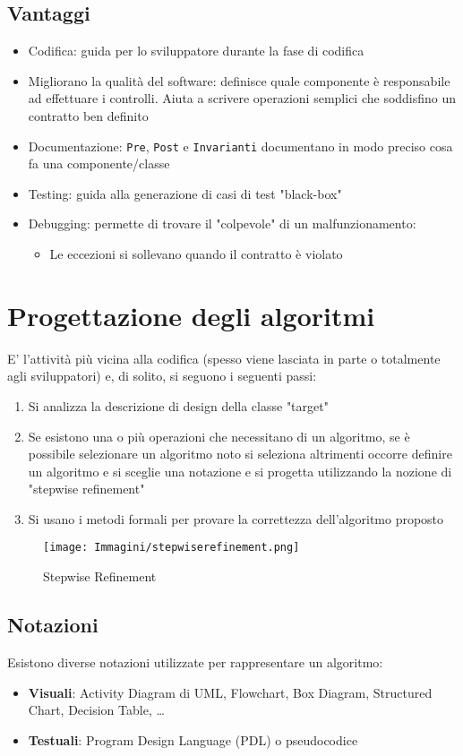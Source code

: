 \documentclass[12pt, a4paper]{report}
\begin{document}
\subsection{Vantaggi}
\begin{itemize}
    \item Codifica: guida per lo sviluppatore durante la fase di codifica
    \item Migliorano la qualità del software: definisce quale componente è responsabile ad effettuare i controlli. Aiuta a scrivere operazioni semplici  che soddisfino un contratto ben definito
    \item Documentazione: \texttt{Pre}, \texttt{Post} e \texttt{Invarianti} documentano in  modo preciso cosa fa una componente/classe
    \item Testing: guida alla generazione di casi di test "black-box"
    \item Debugging: permette di trovare il "colpevole" di un malfunzionamento: \begin{itemize}
        \item Le eccezioni si sollevano quando il contratto è violato
    \end{itemize}
\end{itemize}
\section{Progettazione degli algoritmi}
E' l'attività più vicina alla codifica (spesso viene lasciata in parte o totalmente agli sviluppatori) e, di solito, si seguono i seguenti passi:
\begin{enumerate}
    \item Si analizza la descrizione di design della classe "target"
    \item Se esistono una o più operazioni che necessitano di un algoritmo, se  è possibile selezionare un algoritmo noto si seleziona altrimenti occorre definire un algoritmo e si sceglie una notazione e si progetta utilizzando la nozione di "stepwise refinement"
    \item Si usano i metodi formali per provare la correttezza dell'algoritmo proposto
\end{enumerate}
\begin{figure}[h]
    \centering
    \texttt{[image: Immagini/stepwiserefinement.png]}
    \caption{Stepwise Refinement}
\end{figure}
\subsection{Notazioni}
Esistono diverse notazioni utilizzate per rappresentare un algoritmo:
\begin{itemize}
    \item \textbf{Visuali}: Activity Diagram di UML, Flowchart, Box Diagram, Structured Chart, Decision Table, \ldots
    \item \textbf{Testuali}:  Program Design Language (PDL) o pseudocodice
\end{itemize}
\end{document}
